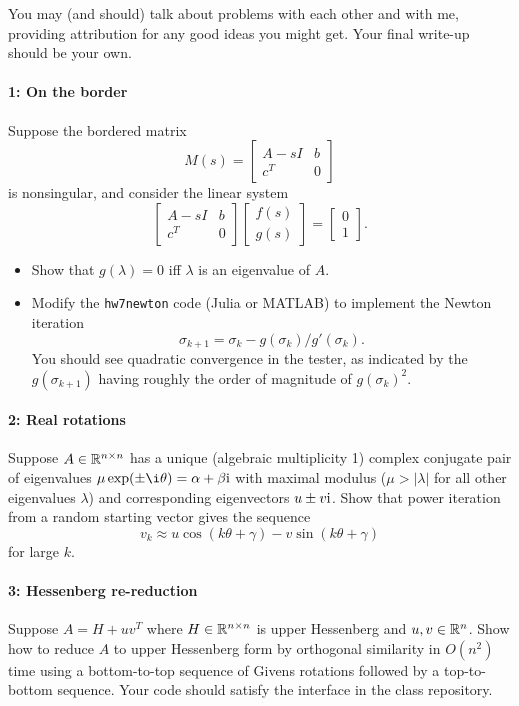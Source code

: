 \documentclass[12pt, leqno]{article} %
\begin{document}

You may (and should) talk about problems with each other and with me,
providing attribution for any good ideas you might get.  Your final
write-up should be your own.


\paragraph*{1: On the border}
Suppose the bordered matrix
\[
  M(s) =
  \begin{bmatrix}
    A-s I & b \\
    c^T & 0
  \end{bmatrix}
\]
is nonsingular, and consider the linear system
\[
  \begin{bmatrix} A-s I & b \\ c^T & 0 \end{bmatrix}
  \begin{bmatrix} f(s) \\ g(s) \end{bmatrix} =
  \begin{bmatrix} 0 \\ 1 \end{bmatrix}.
\]
\begin{itemize}
\item
  Show that $g(\lambda) = 0$ iff $\lambda$ is an eigenvalue of $A$.
\item
  Modify the {\tt hw7newton} code (Julia or MATLAB) to implement the
  Newton iteration
  \[
  \sigma_{k+1} = \sigma_k - g(\sigma_k)/g'(\sigma_k).
  \]
  You should see quadratic convergence in the tester, as indicated by
  the $g(\sigma_{k+1})$ having roughly the order of magnitude
  of $g(\sigma_k)^2$.
\end{itemize}

\paragraph*{2: Real rotations}
Suppose $A \in \mathbb{R}^{n \times n}$ has a unique (algebraic multiplicity 1)
complex conjugate pair of eigenvalues $\mu \exp(\pm \i\theta) = \alpha + \beta \iu$ with maximal
modulus ($\mu > |\lambda|$ for all other eigenvalues $\lambda$) and
corresponding eigenvectors $u \pm v \mathrm{i}$.  Show that power iteration
from a random starting vector gives the sequence
\[
  v_k \approx u \cos(k\theta + \gamma) - v \sin(k\theta+\gamma)
\]
for large $k$.

\paragraph*{3: Hessenberg re-reduction}
Suppose $A = H + uv^T$ where $H \in \mathbb{R}^{n \times n}$ is upper
Hessenberg and $u, v \in \mathbb{R}^n$.  Show how to reduce $A$ to upper
Hessenberg form by orthogonal similarity in $O(n^2)$ time using a
bottom-to-top sequence of Givens rotations followed by a top-to-bottom
sequence.  Your code should satisfy the interface in the class repository.
\end{document}
